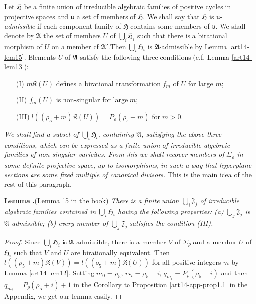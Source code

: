 Let $\mathfrak{H}$ be a finite union of irreducible algebraic families of positive cycles in projective spaces and $\mathfrak{u}$ a set of members of $\mathfrak{H}$. We shall say that $\mathfrak{H}$ is $\mathfrak{u}$-{\em admissible} if each component family of $\mathfrak{H}$ contains some members of $\mathfrak{u}$. We shall denote by $\mathfrak{A}$ the set of members $U$ of $\bigcup_{i}\mathfrak{H}_{i}$ such that there is a birational morphism of $U$ on a member of $\mathfrak{A}'$.\pageoriginale Then $\bigcup_{i}\mathfrak{H}_{i}$ is $\mathfrak{A}$-admissible by Lemma \ref{art14-lem15}. Elements $U$ of $\mathfrak{A}$ satisfy the following three conditions (c.f. Lemma \ref{art14-lem13}):
\begin{itemize}
\item[(I)] $m\mathfrak{K}(U)$ defines a birational transformation $f_{m}$ of $U$ for large $m$; 

\item[(II)] $f_{m}(U)$ is non-singular for large $m$;

\item[(III)] $l((\rho_{5}+m)\mathfrak{K}(U))=P_{\rho}(\rho_{5}+m)$ for $m>0$.
\end{itemize}
{\em We shall find a subset of $\bigcup_{i}\mathfrak{H}_{i}$, containing $\mathfrak{A}$, satisfying the above three conditions, which can be expressed as a finite union of irreducible algebraic families of non-singular varieites. From this we shall recover members of $\Sigma_{\rho}$ in some definite projective space, up to isomorphisms, in such a way that hyperplane sections are some fixed multiple of canonical divisors.} This is the main idea of the rest of this paragraph.

\medskip
\noindent
{\bf Lemma .\label{art14-lem16}}(Lemma 15 in the book)
{\em There is a finite union $\bigcup_{i}\mathfrak{J}_{j}$ of irreducible algebraic families contained in $\bigcup_{i}\mathfrak{H}_{i}$ having the following properties: {\rm(a)} $\bigcup_{j}\mathfrak{J}_{j}$ is $\mathfrak{A}$-admissible; {\rm(b)} every member of $\bigcup_{j}\mathfrak{J}_{j}$ satisfies the condition {\rm(III)}.}

\begin{proof}
Since $\bigcup_{i}\mathfrak{H}_{i}$ is $\mathfrak{A}$-admissible, there is a member $V$ of $\Sigma_{\rho}$ and a member $U$ of $\mathfrak{H}_{i}$ such that $V$ and $U$ are birationally equivalent. Then $l((\rho_{5}+m)\mathfrak{K}(V))=l((\rho_{5}+m)\mathfrak{K}(U))$ for all positive integers $m$ by Lemma \ref{art14-lem12}. Setting $m_{0}=\rho_{5}$, $m_{i}=\rho_{5}+i$, $q_{m_{i}}=P_{\rho}(\rho_{5}+i)$ and then $q_{m_{i}}=P_{\rho}(\rho_{5}+i)+1$ in the Corollary to Proposition \ref{art14-app-prop1.1} in the Appendix, we get our lemma easily.
\end{proof}

